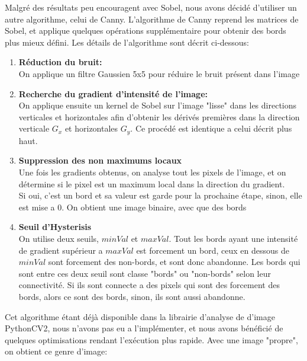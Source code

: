 \documentclass[a4paper, 12pt, titlepage, oneside, french]{article}
\begin{document}
	Malgré des résultats peu encouragent avec Sobel, nous avons décidé d'utiliser un autre algorithme, celui de Canny. L'algorithme de Canny reprend les matrices de Sobel, et applique quelques opérations supplémentaire pour obtenir des bords plus mieux défini. Les détails de l'algorithme sont décrit ci-dessous:
	\begin{enumerate}
		\item \textbf{Réduction du bruit:}\\
			\indent On applique un filtre Gaussien 5x5 pour réduire le bruit présent dans l'image
		\item \textbf{Recherche du gradient d'intensité de l'image:}\\  
			\indent On applique ensuite un kernel de Sobel sur l'image "lisse" dans les directions verticales et horizontales afin d'obtenir les dérivés premières dans
			la direction verticale $G_x$ et horizontales $G_y$. Ce procédé est identique a celui décrit plus haut.

		\item \textbf{Suppression des non maximums locaux}\\
			\indent Une fois les gradients obtenus, on analyse tout les pixels de l'image, et on détermine si le pixel est un maximum local dans la
			direction du gradient. \\
			Si oui, c'est un bord et sa valeur est garde pour la prochaine étape, sinon, elle est mise a 0. On obtient une image binaire, avec que des bords

		\item \textbf{Seuil d'Hysterisis} \\
			\indent On utilise deux seuils, $minVal$ et $maxVal$. Tout les bords ayant une intensité de gradient supérieur a $maxVal$ est forcement un
			bord, ceux en dessous de $minVal$ sont forcement des non-bords, et sont donc abandonne. Les bords qui sont entre ces deux seuil sont classe
			"bords" ou "non-bords" selon leur connectivité. Si ils sont connecte a des pixels qui sont des forcement des bords, alors ce sont des bords,
			sinon, ils sont aussi abandonne.\\

	\end{enumerate}
	Cet algorithme étant déjà disponible dans la librairie d'analyse de d'image PythonCV2, nous n'avons pas eu a l'implémenter, et nous avons bénéficié de quelques optimisations rendant l'exécution plus rapide.
	Avec une image "propre", on obtient ce genre d'image:
	\newpage
\end{document}
